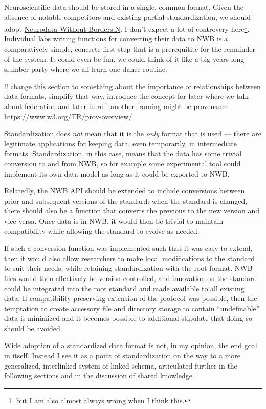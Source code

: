 \documentclass{article}
\begin{document}
Neuroscientific data should be stored in a single, common format. Given
the absence of notable competitors and existing partial standardization,
we should adopt \href{rubelNWBAccessibleData2019a}{Neurodata Without
Borders:N}. I don't expect a lot of controvery here\footnote{but I am
  also almost always wrong when I think this.}. Individual labs writing
functions for converting their data to NWB is a comparatively simple,
concrete first step that is a prerequitite for the remainder of the
system. It could even be fun, we could think of it like a big years-long
slumber party where we all learn one dance routine.

!! change this section to something about the importance of
relationships between data formats, simplify that way. introduce the
concept for later where we talk about federation and later in rdf.
another framing might be provenance https://www.w3.org/TR/prov-overview/

Standardization does \emph{not} mean that it is the \emph{only} format
that is used --- there are legitimate applications for keeping data,
even temporarily, in intermediate formats. Standardization, in this
case, means that the data has some trivial conversion to and from NWB,
so for example some experimental tool could implement its own data model
as long as it could be exported to NWB.

Relatedly, the NWB API should be extended to include conversions between
prior and subsequent versions of the standard: when the standard is
changed, there should also be a function that converts the previous to
the new version and vice versa. Once data is in NWB, it would then be
trivial to maintain compatibility while allowing the standard to evolve
as needed.

If such a conversion function was implemented such that it was easy to
extend, then it would also allow researchers to make local modifications
to the standard to suit their needs, while retaining standardization
with the root format. NWB files would then effectively be version
controlled, and innovation on the standard could be integrated into the
root standard and made available to all existing data. If
compatibility-preserving extension of the protocol was possible, then
the temptation to create accessory file and directory storage to contain
``undefinable'' data is minimized and it becomes possible to additional
stipulate that doing so should be avoided.

Wide adoption of a standardized data format is not, in my opinion, the
end goal in itself. Instead I see it as a point of standardization on
the way to a more generalized, interlinked system of linked schema,
articulated further in the following sections and in the discussion of
\protect\hyperlink{shared-knowledge}{shared knowledge}.
\end{document}

